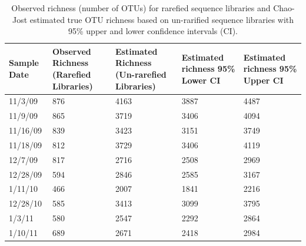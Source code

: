 \begin{landscape}
\begin{table}[htbp]
\centering
\caption{Observed richness (number of OTUs) for rarefied sequence libraries and Chao-Jost estimated true OTU richness based on un-rarified sequence libraries with 95\% upper and lower confidence intervals (CI).}
\label{table:ch5:richness}
\tiny
\begin{tabular}{@{}lllll@{}}
\toprule
Sample Date & Observed Richness (Rarefied Libraries) & Estimated Richness (Un-rarefied Libraries) & Estimated richness 95\% Lower CI & Estimated richness 95\% Upper CI \\ \midrule
11/3/09     & 876                                    & 4163                                   & 3887                           & 4487                           \\
11/9/09     & 865                                    & 3719                                   & 3406                           & 4094                           \\
11/16/09    & 839                                    & 3423                                   & 3151                            & 3749                           \\
11/18/09    & 812                                    & 3729                                   & 3406                           & 4119                           \\
12/7/09     & 817                                    & 2716                                    & 2508                           & 2969                           \\
12/28/09    & 594                                    & 2846                                   & 2585                           & 3167                           \\
1/11/10     & 466                                    & 2007                                   & 1841                           & 2216                           \\
12/28/10    & 585                                    & 3413                                   & 3099                             & 3795                            \\
1/3/11      & 580                                    & 2547                                   & 2292                           & 2864                           \\
1/10/11     & 689                                    & 2671                                   & 2418                           & 2984                           \\

\end{tabular}
\end{table}
\end{landscape}
